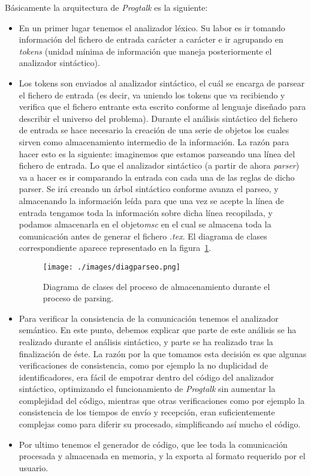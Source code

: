 Básicamente la arquitectura de \textit{Progtalk} es la siguiente:
\begin{itemize}
\item En un primer lugar tenemos el analizador léxico. Su labor es ir
  tomando información del fichero de entrada carácter a carácter e ir
  agrupando en \textit{tokens} (unidad mínima de información que
  maneja posteriormente el analizador sintáctico).
\item Los tokens son enviados al analizador sintáctico, el cuál se
  encarga de parsear el fichero de entrada (es decir, va uniendo los
  tokens que va recibiendo y verifica que el fichero entrante esta
  escrito conforme al lenguaje diseñado para describir el universo del
  problema).  Durante el análisis sintáctico del fichero de entrada se
  hace necesario la creación de una serie de objetos los cuales sirven
  como almacenamiento intermedio de la información. La razón para
  hacer esto es la siguiente: imaginemos que estamos parseando una
  línea del fichero de entrada. Lo que el analizador sintáctico (a
  partir de ahora \textit{parser}) va a hacer es ir comparando la
  entrada con cada una de las reglas de dicho parser. Se irá creando
  un árbol sintáctico conforme avanza el parseo, y almacenando la
  información leída para que una vez se acepte la línea de entrada
  tengamos toda la información sobre dicha línea recopilada, y podamos
  almacenarla en el objeto\textit{msc} en el cual se almacena toda la
  comunicación antes de generar el fichero \textit{.tex}. El diagrama
  de clases correspondiente aparece representado en la
  figura~\ref{fig:diagparseo}.

\begin{figure}
  \texttt{[image: ./images/diagparseo.png]}
  \caption{Diagrama de clases del proceso de almacenamiento durante el
  proceso de parsing.}
  \label{fig:diagparseo}
\end{figure}

\item Para verificar la consistencia de la comunicación tenemos el
  analizador semántico. En este punto, debemos explicar que parte de
  este análisis se ha realizado durante el análisis sintáctico, y
  parte se ha realizado tras la finalización de éste. La razón por la
  que tomamos esta decisión es que algunas verificaciones de
  consistencia, como por ejemplo la no duplicidad de identificadores,
  era fácil de empotrar dentro del código del analizador sintáctico,
  optimizando el funcionamiento de \textit{Progtalk} sin aumentar la
  complejidad del código, mientras que otras verificaciones como por
  ejemplo la consistencia de los tiempos de envío y recepción, eran
  suficientemente complejas como para diferir su procesado,
  simplificando así mucho el código.
\item Por ultimo tenemos el generador de código, que lee toda la
  comunicación procesada y almacenada en memoria, y la exporta al
  formato requerido por el usuario.
\end{itemize}

